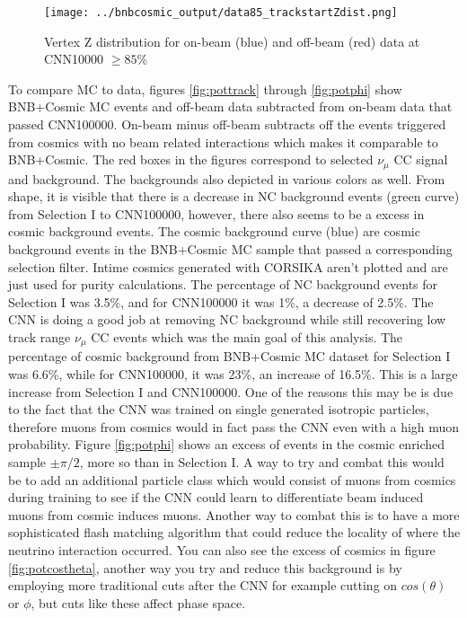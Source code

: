 \begin{figure}[htp!]
\centering
\texttt{[image: ../bnbcosmic\_output/data85\_trackstartZdist.png]}
\caption{Vertex Z distribution for on-beam (blue) and off-beam (red) data at CNN10000 $\geq 85\%$} 
\label{fig:dataZ}
\end{figure}

To compare MC to data, figures \ref{fig:pottrack} through \ref{fig:potphi} show BNB+Cosmic MC events and off-beam data subtracted from on-beam data that passed CNN100000. On-beam minus off-beam subtracts off the events triggered from cosmics with no beam related interactions which makes it comparable to BNB+Cosmic. The red boxes in the figures correspond to selected $\nu_{\mu}$ CC signal and background. The backgrounds also depicted in various colors as well. From shape, it is visible that there is a decrease in NC background events (green curve) from Selection I to CNN100000, however, there also seems to be a excess in cosmic background events. The cosmic background curve (blue) are cosmic background events in the BNB+Cosmic MC sample that passed a corresponding selection filter. Intime cosmics generated with CORSIKA aren't plotted and are just used for purity calculations. The percentage of NC background events for Selection I was 3.5\%, and for CNN100000 it was 1\%, a decrease of 2.5\%. The CNN is doing a good job at removing NC background while still recovering low track range $\nu_{\mu}$ CC events which was the main goal of this analysis. The percentage of cosmic background from BNB+Cosmic MC dataset for Selection I was 6.6\%, while for CNN100000, it was 23\%, an increase of 16.5\%. This is a large increase from Selection I and CNN100000. One of the reasons this may be is due to the fact that the CNN was trained on single generated isotropic particles, therefore muons from cosmics would in fact pass the CNN even with a high muon probability. Figure \ref{fig:potphi} shows an excess of events in the cosmic enriched sample $\pm\pi/2$, more so than in Selection I. A way to try and combat this would be to add an additional particle class which would consist of muons from cosmics during training to see if the CNN could learn to differentiate beam induced muons from cosmic induces muons. Another way to combat this is to have a more sophisticated flash matching algorithm that could reduce the locality of where the neutrino interaction occurred. You can also see the excess of cosmics in figure \ref{fig:potcostheta}, another way you try and reduce this background is by employing more traditional cuts after the CNN for example cutting on $cos(\theta)$ or $\phi$, but cuts like these affect phase space. 


